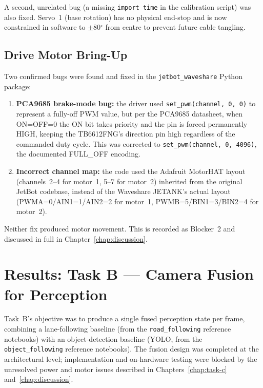 \documentclass{imc-inf}
\begin{document}
A second, unrelated bug (a missing \texttt{import time} in the calibration
script) was also fixed. Servo~1 (base rotation) has no physical end-stop and
is now constrained in software to $\pm$80$^\circ$ from centre to prevent future
cable tangling.

\section{Drive Motor Bring-Up}
\label{sec:drive-motor-bringup}

Two confirmed bugs were found and fixed in the \texttt{jetbot\_waveshare} Python
package:

\begin{enumerate}
\item \textbf{PCA9685 brake-mode bug:} the driver used
\texttt{set\_pwm(channel, 0, 0)} to represent a fully-off PWM value, but per the
PCA9685 datasheet, when ON=OFF=0 the ON bit takes priority and the pin is forced
permanently HIGH, keeping the TB6612FNG's direction pin high regardless of the
commanded duty cycle. This was corrected to
\texttt{set\_pwm(channel, 0, 4096)}, the documented FULL\_OFF encoding.
\item \textbf{Incorrect channel map:} the code used the Adafruit MotorHAT layout
(channels~2--4 for motor~1, 5--7 for motor~2) inherited from the original JetBot
codebase, instead of the Waveshare JETANK's actual layout (PWMA=0/AIN1=1/AIN2=2
for motor~1, PWMB=5/BIN1=3/BIN2=4 for motor~2).
\end{enumerate}

Neither fix produced motor movement. This is recorded as Blocker~2 and discussed
in full in Chapter~\ref{chap:discussion}.

\chapter{Results: Task B --- Camera Fusion for Perception}
\label{chap:task-b}

Task~B's objective was to produce a single fused perception state per frame,
combining a lane-following baseline (from the \texttt{road\_following} reference
notebooks) with an object-detection baseline (YOLO, from the
\texttt{object\_following} reference notebooks). The fusion design was completed
at the architectural level; implementation and on-hardware testing were blocked
by the unresolved power and motor issues described in Chapters~\ref{chap:task-c}
and~\ref{chap:discussion}.
\end{document}
